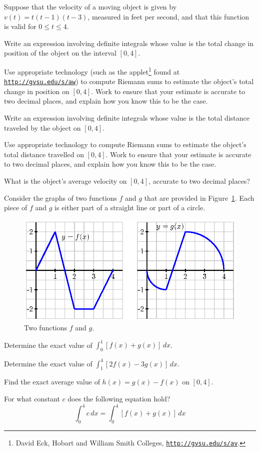 \begin{exercises}
  \item Suppose that the velocity of a moving object is given by $v(t) = t(t-1)(t-3)$, measured in feet per second, and that this function is valid for $0 \le t \le 4$.
  	\ba
		\item Write an expression involving definite integrals whose value is the total change in position of the object on the interval $[0,4]$.
		\item Use appropriate technology (such as the applet\footnote{David Eck, Hobart and William Smith Colleges, \href{http://gvsu.edu/s/av}{\texttt{http://gvsu.edu/s/av}}.} found at \href{http://gvsu.edu/s/aw}{\texttt{http://gvsu.edu/s/aw}}) to compute Riemann sums to estimate the object's total change in position on $[0,4]$.  Work to ensure that your estimate is accurate to two decimal places, and explain how you know this to be the case.
		\item Write an expression involving definite integrals whose value is the total distance traveled by the object on $[0,4]$.
		\item Use appropriate technology to compute Riemann sums to estimate the object's total distance travelled on $[0,4]$.  Work to ensure that your estimate is accurate to two decimal places, and explain how you know this to be the case.
		\item What is the object's average velocity on $[0,4]$, accurate to two decimal places?
	\ea
	
  \item Consider the graphs of two functions $f$ and $g$ that are provided in Figure~\ref{F:4.3.Ez2}.  Each piece of $f$ and $g$ is either part of a straight line or part of a circle.
\begin{figure}[h]
\begin{center}
\includegraphics{figures/4_3_Ez2.eps}
\caption{Two functions $f$ and $g$.} \label{F:4.3.Ez2}
\end{center}
\end{figure} 
  \ba
  	\item Determine the exact value of $\int_0^1 [f(x) + g(x)]\,dx$.
	\item Determine the exact value of $\int_1^4 [2f(x) - 3g(x)] \, dx$.
	\item Find the exact average value of $h(x) = g(x) - f(x)$ on $[0,4]$.
	\item For what constant $c$ does the following equation hold?
	$$\int_0^4 c \, dx = \int_0^4 [f(x) + g(x)] \, dx$$
  \ea
  

\end{exercises}
